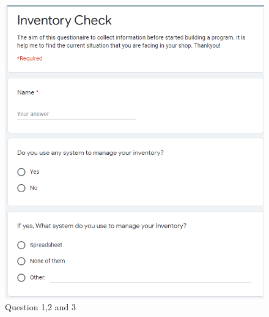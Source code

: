 \begin{figure}[h]
\centering
    \includegraphics[scale=0.57]
    {images/survey1.png}
    \caption{Question 1,2 and 3}
    \label{fig: Question 1,2 and 3}
\end{figure}

